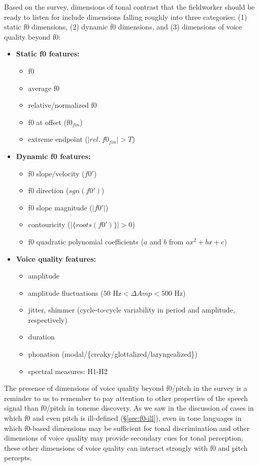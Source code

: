 \documentclass[12pt]{article}
\begin{document}
Based on the survey, dimensions of tonal contrast that the fieldworker
should be ready to listen for include dimensions falling roughly into
three categories: (1) static f0 dimensions, (2) dynamic f0 dimensions,
and (3) dimensions of voice quality beyond f0:

\begin{itemize}
\item[] \textbf{Static f0 features:} 
  \begin{itemize}
    \item f0  
    \item average f0
    \item relative/normalized f0
    \item f0 at offset (f0$_{fin}$)
    \item extreme endpoint ($|rel.\ f0_{fin}| > T$)
\end{itemize}
\item[] \textbf{Dynamic f0 features:}
  \begin{itemize}
  \item f0 slope/velocity ($f0'$)
  \item f0 direction ($sgn(f0')$)
  \item f0 slope magnitude ($|f0'|$)
  \item contouricity ($|\{roots(f0')\}| > 0$) 
  \item f0 quadratic polynomial coefficients ($a$ and $b$ from $ax^2
    +bx +c$)
  \end{itemize}
\item[] \textbf{Voice quality features:}
  \begin{itemize}
  \item amplitude
  \item amplitude fluctuations ($\mbox{50 Hz} < \Delta Amp < \mbox{500 Hz}$)
  \item jitter, shimmer (cycle-to-cycle variability in period and amplitude, respectively)
  \item duration
  \item phonation (modal/\{creaky/glottalized/laryngealized\})
  \item spectral measures: H1-H2
  \end{itemize}
\end{itemize}

The presence of dimensions of voice quality beyond f0/pitch in the
survey is a reminder to us to remember to pay attention to other
properties of the speech signal than f0/pitch in toneme discovery. As
we saw in the discussion of cases in which f0 and even pitch is
ill-defined (\S\ref{sec:f0-ill}), even in tone languages in which
f0-based dimensions may be sufficient for tonal discrimination and
other dimensions of voice quality may provide secondary cues for tonal
perception, these other dimensions of voice quality can interact
strongly with f0 and pitch percepts. 
\end{document}
